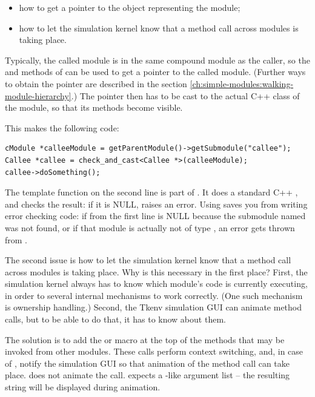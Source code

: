\begin{itemize}
  \item how to get a pointer to the object representing the module;
  \item how to let the simulation kernel know that a method call across modules
     is taking place.
\end{itemize}

Typically, the called module is in the same compound module as the caller,
so the  and  methods of
 can be used to get a  pointer to the
called module. (Further ways to obtain the pointer are described
in the section \ref{ch:simple-modules:walking-module-hierarchy}.)
The  pointer then has to be cast to the actual C++ class
of the module, so that its methods become visible.

This makes the following code:

\begin{verbatim}
cModule *calleeModule = getParentModule()->getSubmodule("callee");
Callee *callee = check_and_cast<Callee *>(calleeModule);
callee->doSomething();
\end{verbatim}

The  template function on the second line
is part of {\opp}. It does a standard C++ ,
and checks the result: if it is NULL,  raises an {\opp} error.
Using  saves you from writing error checking
code: if  from the first line is NULL because
the submodule named  was not found, or if that
module is actually not of type , an error gets thrown
from .

The second issue is how to let the simulation kernel know that
a method call across modules is taking place. Why is this necessary
in the first place? First, the simulation kernel always has to know which
module's code is currently executing, in order to several internal
mechanisms to work correctly. (One such mechanism is ownership handling.)
Second, the Tkenv simulation GUI can animate method calls,
but to be able to do that, it has to know about them.

The solution is to add the  or 
macro at the top of the methods that may be invoked from other
modules. These calls perform context switching, and, in case of
, notify the simulation GUI so that animation
of the method call can take place. 
does not animate the call.  expects a
-like argument list -- the resulting string will
be displayed during animation.

